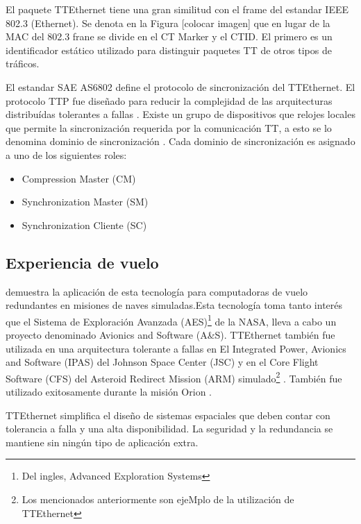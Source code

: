 El paquete TTEthernet tiene una gran similitud con el frame del estandar IEEE 802.3 (Ethernet). Se denota en la Figura [colocar imagen] que en lugar de la MAC del 802.3 frane se divide en el CT Marker y el CTID. El primero es un identificador estático utilizado para distinguir paquetes \ac{TT} de otros tipos de tráficos.


El estandar SAE AS6802 define el protocolo de sincronización del TTEthernet. El protocolo TTP fue diseñado para reducir la complejidad de las arquitecturas distribuídas tolerantes a fallas \citep{TTTechWeb}. Existe un grupo de dispositivos que relojes locales que permite la sincronización requerida por la comunicación \ac{TT}, a esto se lo denomina dominio de sincronización \citep{Loveless15}. Cada dominio de sincronización es asignado a uno de los siguientes roles:
\begin{itemize}
	\item Compression Master (CM)
	\item Synchronization Master (SM)
	\item Synchronization Cliente (SC)
\end{itemize}

\subsection{Experiencia de vuelo}
\cite{Loveless15} demuestra la aplicación de esta tecnología para computadoras de vuelo redundantes en misiones de naves simuladas.Esta tecnología toma tanto interés que el Sistema de Exploración Avanzada (AES)\footnote{Del ingles, Advanced Exploration Systems} de la \ac{NASA}, lleva a cabo un proyecto denominado Avionics and Software (A&S). TTEthernet también fue utilizada en una arquitectura tolerante a fallas en El Integrated Power, Avionics and Software (IPAS)  del Johnson Space Center (JSC) y en el Core Flight Software (CFS) del Asteroid Redirect Mission (ARM) simulado\footnote{Los mencionados anteriormente son ejeMplo de la utilización de TTEthernet} \citep{Loveless15}. También fue utilizado exitosamente durante la misión Orion \citep{TTTechOrion} .

TTEthernet simplifica el diseño de sistemas espaciales que deben contar con tolerancia a falla y una alta disponibilidad. La seguridad y la redundancia se mantiene sin ningún tipo de aplicación extra.
